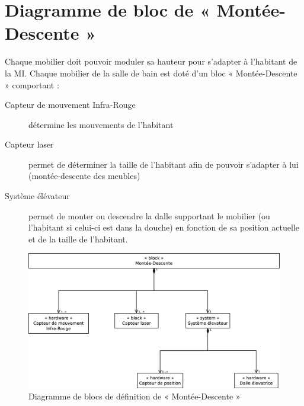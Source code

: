 \section{Diagramme de bloc de « Montée-Descente »}
Chaque mobilier doit pouvoir moduler sa hauteur pour s'adapter à l'habitant de la MI. Chaque mobilier de la salle de bain est doté d'un bloc « Montée-Descente » comportant :
\begin{description}
	\item[Capteur de mouvement Infra-Rouge] détermine les mouvements de l'habitant
	\item[Capteur laser] permet de déterminer la taille de l'habitant afin de pouvoir s'adapter à lui (montée-descente des meubles)
	\item[Système élévateur] permet de monter ou descendre la dalle supportant le mobilier (ou l'habitant si celui-ci est dans la douche) en fonction de sa position actuelle et de la taille de l'habitant.   
\end{description}
\vfill
\begin{figure}[H]
	\centering
	\includegraphics[width=1.0\linewidth]{diagrams/bathroom/diagramme_blocks_bdd2.eps}
	\caption{Diagramme de blocs de définition de « Montée-Descente »}
	\label{fig:diagramme_bdd2}
\end{figure}

